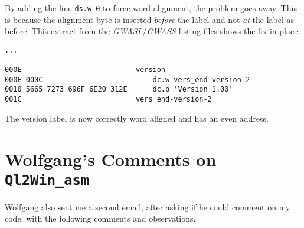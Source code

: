 By adding the line \lstinline[showstringspaces=false]!ds.w 0! to
force word alignment, the problem goes away. This is because the alignment
byte is inserted \emph{before} the label and not \emph{at} the label
as before. This extract from the \emph{GWASL}/\emph{GWASS} listing
files shows the fix in place:

\begin{lstlisting}
...

000E                           version
000E 000C                          dc.w vers_end-version-2
0010 5665 7273 696F 6E20 312E      dc.b 'Version 1.00'
001C                           vers_end-version-2
\end{lstlisting}

The version label is now correctly word aligned and has an even address.

\section{Wolfgang's Comments on \texttt{Ql2Win\_asm}}

Wolfgang also sent me a second email, after asking if he could comment
on my code, with the following comments and observations. 

